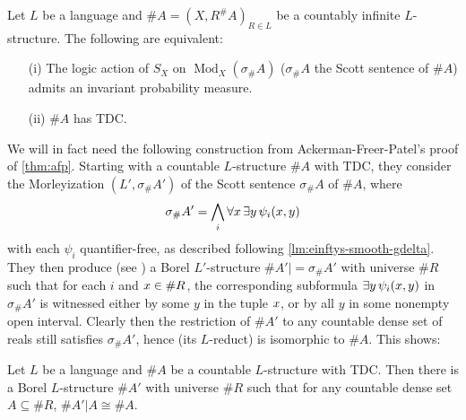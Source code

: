 \documentclass[11pt]{article}
\DeclareMathOperator\Mod{Mod}
\begin{document}
\begin{theorem}
\label{thm:afp}
Let $L$ be a language and $\#A = (X, R^\#A)_{R \in L}$ be a countably infinite $L$-structure.  The following are equivalent:
\begin{enumerate}
\item[(i)]  The logic action of $S_X$ on $\Mod_X(\sigma_\#A)$ ($\sigma_\#A$ the Scott sentence of $\#A$) admits an invariant probability measure.
\item[(ii)]  $\#A$ has TDC.
\end{enumerate}
\end{theorem}

We will in fact need the following construction from Ackerman-Freer-Patel's proof of \cref{thm:afp}.  Starting with a countable $L$-structure $\#A$ with TDC, they consider the Morleyization $(L', \sigma_\#A')$ of the Scott sentence $\sigma_\#A$ of $\#A$, where
\begin{align*}
\sigma_\#A' = \bigwedge_i \forall \-x\, \exists y\, \psi_i(\-x, y)
\end{align*}
with each $\psi_i$ quantifier-free, as described following \cref{lm:einftys-smooth-gdelta}.  They then produce (see \cite[Section~3.4]{AFP}) a Borel $L'$-structure $\#A' |= \sigma_\#A'$ with universe $\#R$ such that for each $i$ and $\-x \in \#R$, the corresponding subformula $\exists y\, \psi_i(\-x, y)$ in $\sigma_\#A'$ is witnessed either by some $y$ in the tuple $\-x$, or by all $y$ in some nonempty open interval.  Clearly then the restriction of $\#A'$ to any countable dense set of reals still satisfies $\sigma_\#A'$, hence (its $L$-reduct) is isomorphic to $\#A$.  This shows:

\begin{corollary}
\label{thm:afp-dense}
Let $L$ be a language and $\#A$ be a countable $L$-structure with TDC.  Then there is a Borel $L$-structure $\#A'$ with universe $\#R$ such that for any countable dense set $A \subseteq \#R$, $\#A'|A \cong \#A$.
\end{corollary}
\end{document}
